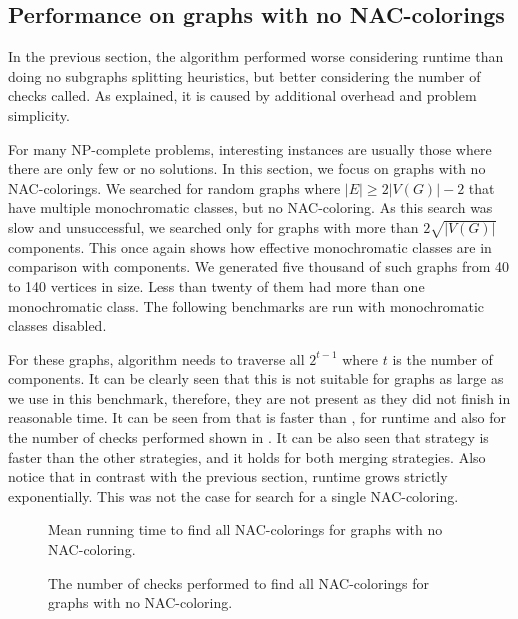 \subsection{Performance on graphs with no NAC-colorings}

In the previous section, the \Subgraphs{} algorithm performed worse considering runtime
than doing no subgraphs splitting heuristics,
but better considering the number of checks called.
As explained, it is caused by additional overhead and problem simplicity.

For many NP-complete problems, interesting instances are usually
those where there are only few or no solutions.
In this section, we focus on graphs with no NAC-colorings.
We searched for random graphs where \( |E| \ge 2|V(G)| - 2 \) that have
multiple monochromatic classes, but no NAC-coloring.
As this search was slow and unsuccessful, we searched only for
graphs with more than \( 2\sqrt{|V(G)|} \) \trcon{} components.
This once again shows how effective monochromatic classes are
in comparison with \trcon{} components.
We generated five thousand of such graphs from 40 to 140 vertices in size.
Less than twenty of them had more than one monochromatic class.
The following benchmarks are run with monochromatic classes disabled.

For these graphs, \NaiveCycles{} algorithm needs to traverse all \( 2^{t-1} \)
where \( t \) is the number of \trcon{} components. It can be clearly seen that
this is not suitable for graphs as large as we use in this benchmark,
therefore, they are not present as they did not finish in reasonable time.
It can be seen from 
that \SharedVertices{} is faster than \MergeLinear{},
for runtime and also for the number of checks performed
shown in .
It can be also seen that \NeighborsDegree{} strategy is
faster than the other strategies, and it holds for both merging strategies.
Also notice that in contrast with the previous section,
runtime grows strictly exponentially. This was not the case for search for a single NAC-coloring.


\begin{figure}[p]
	\centering
	\scalebox{0.5}{}
	\caption[Mean runtime for graphs with no NAC-coloring.]{
		Mean running time to find all NAC-colorings for graphs with no NAC-coloring.}%
	\label{fig:graph_no_nac_coloring_first_runtime}
\end{figure}%
\begin{figure}[p]
	\centering
	\scalebox{0.5}{}
	\caption[Checks performed for graphs with no NAC-coloring.]{
		The number of checks performed to find all NAC-colorings for graphs with no NAC-coloring.}%
	\label{fig:graph_no_nac_coloring_first_checks}
\end{figure}%

